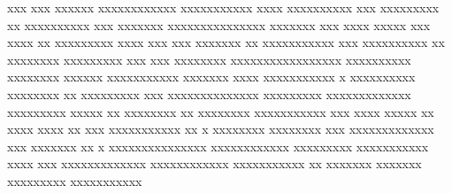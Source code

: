 \begin{otherlanguage}{english}
xxx xxx xxxxxx xxxxxxxxxxxx xxxxxxxxxxx xxxx xxxxxxxxxx xxx xxxxxxxxx xx xxxxxxxxxx xxx xxxxxxx xxxxxxxxxxxxxxx xxxxxxx xxx xxxx xxxxx xxx xxxx xx xxxxxxxxx xxxx xxx xxx xxxxxxx xx xxxxxxxxxxx xxx xxxxxxxxxx xx xxxxxxxx xxxxxxxxx xxx xxx xxxxxxxx xxxxxxxxxxxxxxxxx xxxxxxxxxx xxxxxxxx xxxxxx xxxxxxxxxxx xxxxxxx xxxx xxxxxxxxxxx x xxxxxxxxxx xxxxxxxx xx xxxxxxxxx xxx xxxxxxxxxxxxxx xxxxxxxxx xxxxxxxxxxxxx xxxxxxxxx xxxxx xx xxxxxxxx xx xxxxxxxx xxxxxxxxxxx xxx xxxx xxxxx xx xxxx xxxx xx xxx xxxxxxxxxxx xx x xxxxxxxx xxxxxxxx xxx xxxxxxxxxxxxx xxx xxxxxxx xx x xxxxxxxxxxxxxxx xxxxxxxxxxxx xxxxxxxxx xxxxxxxxxxx xxxx xxx xxxxxxxxxxxxx xxxxxxxxxxxx xxxxxxxxxxx xx xxxxxxx xxxxxxx xxxxxxxxx xxxxxxxxxxx

\end{otherlanguage}